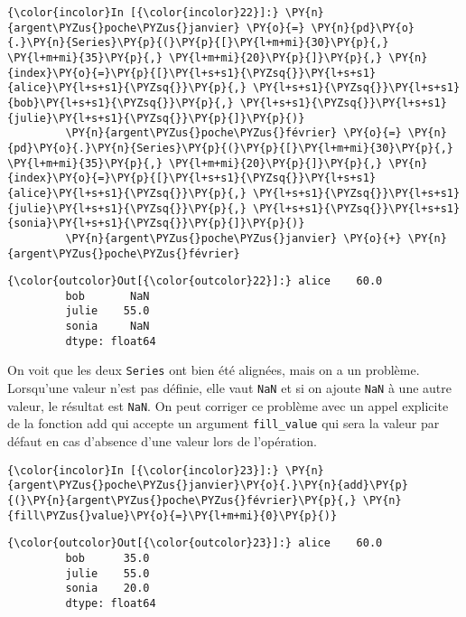     \begin{Verbatim}[commandchars=\\\{\}]
{\color{incolor}In [{\color{incolor}22}]:} \PY{n}{argent\PYZus{}poche\PYZus{}janvier} \PY{o}{=} \PY{n}{pd}\PY{o}{.}\PY{n}{Series}\PY{p}{(}\PY{p}{[}\PY{l+m+mi}{30}\PY{p}{,} \PY{l+m+mi}{35}\PY{p}{,} \PY{l+m+mi}{20}\PY{p}{]}\PY{p}{,} \PY{n}{index}\PY{o}{=}\PY{p}{[}\PY{l+s+s1}{\PYZsq{}}\PY{l+s+s1}{alice}\PY{l+s+s1}{\PYZsq{}}\PY{p}{,} \PY{l+s+s1}{\PYZsq{}}\PY{l+s+s1}{bob}\PY{l+s+s1}{\PYZsq{}}\PY{p}{,} \PY{l+s+s1}{\PYZsq{}}\PY{l+s+s1}{julie}\PY{l+s+s1}{\PYZsq{}}\PY{p}{]}\PY{p}{)}
         \PY{n}{argent\PYZus{}poche\PYZus{}février} \PY{o}{=} \PY{n}{pd}\PY{o}{.}\PY{n}{Series}\PY{p}{(}\PY{p}{[}\PY{l+m+mi}{30}\PY{p}{,} \PY{l+m+mi}{35}\PY{p}{,} \PY{l+m+mi}{20}\PY{p}{]}\PY{p}{,} \PY{n}{index}\PY{o}{=}\PY{p}{[}\PY{l+s+s1}{\PYZsq{}}\PY{l+s+s1}{alice}\PY{l+s+s1}{\PYZsq{}}\PY{p}{,} \PY{l+s+s1}{\PYZsq{}}\PY{l+s+s1}{julie}\PY{l+s+s1}{\PYZsq{}}\PY{p}{,} \PY{l+s+s1}{\PYZsq{}}\PY{l+s+s1}{sonia}\PY{l+s+s1}{\PYZsq{}}\PY{p}{]}\PY{p}{)}
         \PY{n}{argent\PYZus{}poche\PYZus{}janvier} \PY{o}{+} \PY{n}{argent\PYZus{}poche\PYZus{}février}
\end{Verbatim}


\begin{Verbatim}[commandchars=\\\{\}]
{\color{outcolor}Out[{\color{outcolor}22}]:} alice    60.0
         bob       NaN
         julie    55.0
         sonia     NaN
         dtype: float64
\end{Verbatim}
            
    On voit que les deux \texttt{Series} ont bien été alignées, mais on a un
problème. Lorsqu'une valeur n'est pas définie, elle vaut \texttt{NaN} et
si on ajoute \texttt{NaN} à une autre valeur, le résultat est
\texttt{NaN}. On peut corriger ce problème avec un appel explicite de la
fonction add qui accepte un argument \texttt{fill\_value} qui sera la
valeur par défaut en cas d'absence d'une valeur lors de l'opération.

    \begin{Verbatim}[commandchars=\\\{\}]
{\color{incolor}In [{\color{incolor}23}]:} \PY{n}{argent\PYZus{}poche\PYZus{}janvier}\PY{o}{.}\PY{n}{add}\PY{p}{(}\PY{n}{argent\PYZus{}poche\PYZus{}février}\PY{p}{,} \PY{n}{fill\PYZus{}value}\PY{o}{=}\PY{l+m+mi}{0}\PY{p}{)}
\end{Verbatim}


\begin{Verbatim}[commandchars=\\\{\}]
{\color{outcolor}Out[{\color{outcolor}23}]:} alice    60.0
         bob      35.0
         julie    55.0
         sonia    20.0
         dtype: float64
\end{Verbatim}
            
